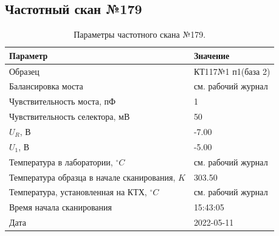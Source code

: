 \subsection{Частотный скан №179}
\begin{table}[!ht]
    \centering
    \caption{Параметры частотного скана №179.}
    \begin{tabular}{|l|l|}
        \hline
        Параметр                                       & Значение                  \\ \hline
        Образец                                        & КТ117№1 п1(база 2)        \\ \hline
        Балансировка моста                             & см. рабочий журнал        \\ \hline
        Чувствительность моста, пФ                     & 1                         \\ \hline
        Чувствительность селектора, мВ                 & 50                        \\ \hline
        $U_R$, В                                       & -7.00                     \\ \hline
        $U_1$, В                                       & -5.00                     \\ \hline
        Температура в лаборатории, $^\circ C$          & см. рабочий журнал        \\ \hline
        Температура образца в начале сканирования, $K$ & 303.50                    \\ \hline
        Температура, установленная на КТХ, $^\circ C$  & см. рабочий журнал        \\ \hline
        Время начала сканирования                      & 15:43:05                  \\ \hline
        Дата                                           & 2022-05-11                \\ \hline
    \end{tabular}
    \label{table:frequency_scan_179}
\end{table}

